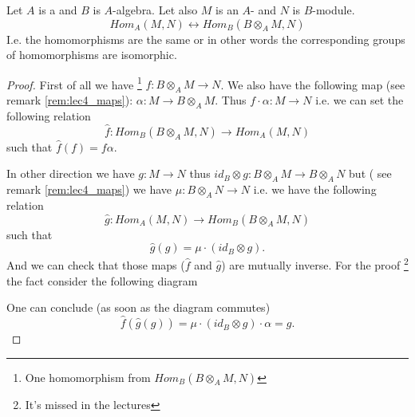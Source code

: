 \begin{theorem}
  Let $A$ is a  and $B$ is $A$-algebra. Let also $M$
  is an $A$- and $N$ is $B$-module.
  \[
  Hom_A\left(M, N\right)
  \leftrightarrow
  Hom_B\left(B \otimes_A M, N\right)
  \]
  I.e. the homomorphisms are the same or in other words the
  corresponding groups of homomorphisms are isomorphic. 
  \begin{proof}
    First of all we have
    \footnote{
      One homomorphism from  $Hom_B\left(B \otimes_A M, N\right)$
    }
     $f: B \otimes_A M \to N$. We also have
    the following map (see remark \ref{rem:lec4_maps}):
    $\alpha: M \to B \otimes_A M$. 
    Thus $f \cdot \alpha: M \to N$ i.e.
    we can set the following relation
    \[
    \hat{f} : Hom_B\left(B \otimes_A M, N\right)
    \to Hom_A\left(M, N\right)
    \]
    such that $\hat{f}\left(f\right) = f \alpha$.

    In other direction we have $g: M \to N$ thus
    $id_B \otimes g: B \otimes_A M \to B \otimes_A N$ but
    ( see remark \ref{rem:lec4_maps}) we have
    $\mu: B \otimes_A N \to N$ i.e. we have the following relation
    \[
    \hat{g} : Hom_A\left(M, N\right) \to
    Hom_B\left(B \otimes_A M, N\right)
    \]
    such that
    \[
    \hat g(g) = \mu \cdot (id_B \otimes g).
    \]   
    And we can check that those maps ($\hat{f}$ and $\hat{g}$) are
    mutually inverse. For the proof
    \footnote{
      It's missed in the lectures
    }
    the fact consider the following diagram
    
    
    One can conclude (as soon as the diagram commutes)
    \[
    \hat{f}\left(\hat{g}\left(g\right)\right) =
    \mu \cdot (id_B \otimes g) \cdot \alpha = g.
    \]
  \end{proof}
  \label{thm:basechange}
\end{theorem}

